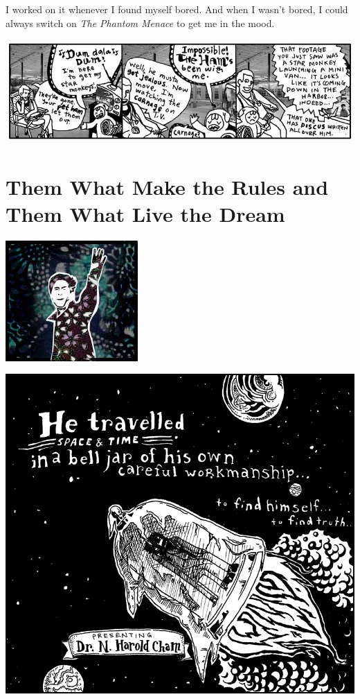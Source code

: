 \documentclass[10pt,twoside]{report}
\begin{document}
I worked on it whenever I found myself bored.  And when I wasn't
bored, I could always switch on {\em The Phantom Menace} to get me in
the mood.

	\includegraphics[width=1.0\textwidth]{cache/31.png}
\newpage
\thispagestyle{empty}
\mbox{}
\cleartooddpage


\chapter{Them What Make the Rules and Them What Live the Dream}
\vfill
\begin{center}
  \includegraphics{cache/chapterpoignantguide5.png}
\end{center}
\vspace{2cm}
\newpage
\thispagestyle{empty}
\mbox{}
\clearpage
	\includegraphics[width=1.0\textwidth]{cache/32.png}
\end{document}
